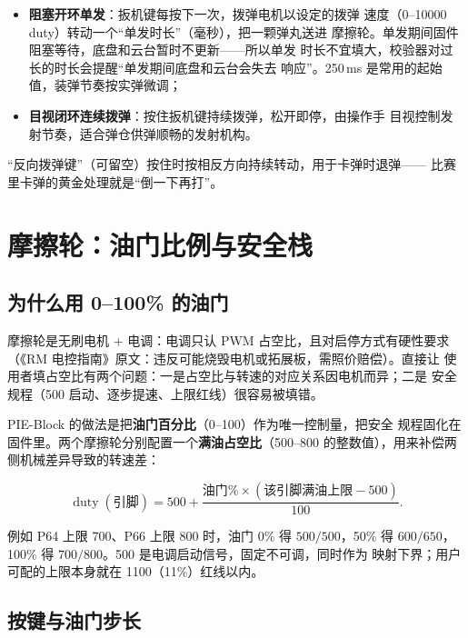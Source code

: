 \begin{itemize}
  \item \textbf{阻塞开环单发}：扳机键每按下一次，拨弹电机以设定的拨弹
        速度（0--10000 duty）转动一个“单发时长”（毫秒），把一颗弹丸送进
        摩擦轮。单发期间固件阻塞等待，底盘和云台暂时不更新——所以单发
        时长不宜填大，校验器对过长的时长会提醒“单发期间底盘和云台会失去
        响应”。250\,ms 是常用的起始值，装弹节奏按实弹微调；
  \item \textbf{目视闭环连续拨弹}：按住扳机键持续拨弹，松开即停，由操作手
        目视控制发射节奏，适合弹仓供弹顺畅的发射机构。
\end{itemize}

“反向拨弹键”（可留空）按住时按相反方向持续转动，用于卡弹时退弹——
比赛里卡弹的黄金处理就是“倒一下再打”。

\section{摩擦轮：油门比例与安全栈}

\subsection{为什么用 0--100\% 的油门}

摩擦轮是无刷电机 + 电调：电调只认 PWM 占空比，且对启停方式有硬性要求
（《RM 电控指南》原文：违反可能烧毁电机或拓展板，需照价赔偿）。直接让
使用者填占空比有两个问题：一是占空比与转速的对应关系因电机而异；二是
安全规程（500 启动、逐步提速、上限红线）很容易被填错。

PIE-Block 的做法是把\textbf{油门百分比}（0--100）作为唯一控制量，把安全
规程固化在固件里。两个摩擦轮分别配置一个\textbf{满油占空比}（500--800
的整数值），用来补偿两侧机械差异导致的转速差：

\begin{equation}
  \operatorname{duty}(\text{引脚}) = 500 + \frac{\text{油门}\% \times
  (\text{该引脚满油上限} - 500)}{100}.
  \label{eq:ch04-friction-map}
\end{equation}

例如 P64 上限 700、P66 上限 800 时，油门 0\% 得 $500/500$，50\% 得
$600/650$，100\% 得 $700/800$。500 是电调启动信号，固定不可调，同时作为
映射下界；用户可配的上限本身就在 1100（11\%）红线以内。

\subsection{按键与油门步长}

